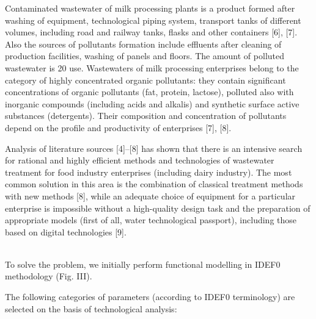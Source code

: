 \documentclass[a4paper, 10pt,twocolumn]{article}
\begin{document}
Contaminated wastewater of milk processing plants is
a product formed after washing of equipment, technological piping system, transport tanks of different volumes,
including road and railway tanks, flasks and other containers [6], [7]. Also the sources of pollutants formation
include effluents after cleaning of production facilities,
washing of panels and floors. The amount of polluted
wastewater is 20%
use. Wastewaters of milk processing enterprises belong
to the category of highly concentrated organic pollutants:
they contain significant concentrations of organic pollutants (fat, protein, lactose), polluted also with inorganic
compounds (including acids and alkalis) and synthetic
surface active substances (detergents). Their composition
and concentration of pollutants depend on the profile and
productivity of enterprises [7], [8].
\par Analysis of literature sources [4]–[8] has shown that
there is an intensive search for rational and highly efficient methods and technologies of wastewater treatment
for food industry enterprises (including dairy industry).
The most common solution in this area is the combination of classical treatment methods with new methods [8],
while an adequate choice of equipment for a particular
enterprise is impossible without a high-quality design
task and the preparation of appropriate models (first of
all, water technological passport), including those based
on digital technologies [9].\\

\\

To solve the problem, we initially perform functional
modelling in IDEF0 methodology (Fig. III).
\par The following categories of parameters (according
to IDEF0 terminology) are selected on the basis of
technological analysis:
\end{document}
